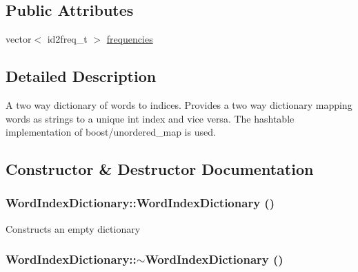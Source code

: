 \subsection*{Public Attributes}
\begin{DoxyCompactItemize}
\item 
vector$<$ id2freq\_\-t $>$ \hyperlink{class_word_index_dictionary_abcff7bfd6b63bf0a14ba38bf8bb7be9f}{frequencies}
\end{DoxyCompactItemize}


\subsection{Detailed Description}
A two way dictionary of words to indices. Provides a two way dictionary mapping words as strings to a unique int index and vice versa. The hashtable implementation of boost/unordered\_\-map is used. 

\subsection{Constructor \& Destructor Documentation}
\hypertarget{class_word_index_dictionary_a25019e66f8c3c6e1adba40157abf69bc}{
\subsubsection[{WordIndexDictionary}]{\setlength{\rightskip}{0pt plus 5cm}WordIndexDictionary::WordIndexDictionary ()}}
\label{class_word_index_dictionary_a25019e66f8c3c6e1adba40157abf69bc}
Constructs an empty dictionary \hypertarget{class_word_index_dictionary_a6e3ee8eeacf9ace4757f4f345e519e30}{
\subsubsection[{$\sim$WordIndexDictionary}]{\setlength{\rightskip}{0pt plus 5cm}WordIndexDictionary::$\sim$WordIndexDictionary ()}}
\label{class_word_index_dictionary_a6e3ee8eeacf9ace4757f4f345e519e30}


